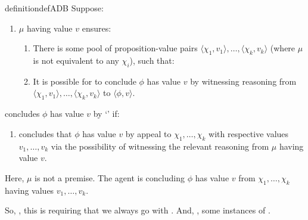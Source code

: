 \begin{note}
  \begin{restatable}[\adB{}]{definition}{defADB}
    \label{AR:adB}
    \label{def:adB}
    Suppose:
    \begin{enumerate}[label=\textsf{I:\arabic*}., ref=(\textsf{I}:\arabic*), series=adB_counter]
    \item
      \label{def:adB:poss}
      \(\mu\) having value \(v\) ensures:
      \begin{enumerate}
      \item
        There is some pool of proposition-value pairs \(\langle \chi_{1},v_{1} \rangle,\dots,\langle \chi_{k},v_{k} \rangle\) (where \(\mu\) is not equivalent to any \(\chi_{i}\)), such that:
      \item
        It is possible for \vAgent{} to conclude \(\phi\) has value \(v\) by witnessing reasoning from \(\langle \chi_{1},v_{1} \rangle,\dots,\langle \chi_{k},v_{k} \rangle\) to \(\langle \phi,v \rangle\).
      \end{enumerate}
    \end{enumerate}
    \vAgent{} concludes \(\phi\) has value \(v\) by `\adB{}' if:
    \begin{enumerate}[label=\textsf{I}:\arabic*., ref=(\textsf{I}:\arabic*), resume*=adB_counter]
    \item
      \label{def:adB:inter}
      \vAgent{} concludes that \(\phi\) has value \(v\) by appeal to \(\chi_{1},\dots,\chi_{k}\) with respective values \(v_{1},\dots,v_{k}\) via the possibility of witnessing the relevant reasoning from \(\mu\) having value \(v\).
    \end{enumerate}
    \vspace{-\baselineskip}
  \end{restatable}

  Here, \(\mu\) is not a premise.
  The agent is concluding \(\phi\) has value \(v\) from \(\chi_{1},\dots,\chi_{k}\) having values \(v_{1},\dots,v_{k}\).
\end{note}

\begin{note}
  So, \ESU{}, this is requiring that we always go with \adA{}.
  And, \EAS{}, some instances of \adB{}.
\end{note}

